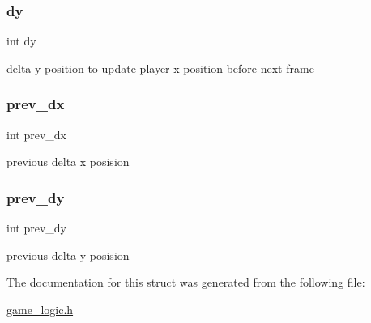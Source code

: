 \subsubsection{\texorpdfstring{dy}{dy}}
{\footnotesize\ttfamily int dy}

delta y position to update player x position before next frame \mbox{\label{structplayer__movement_a73691226e0004c9c476b99fb3a03a1e2}} 
\subsubsection{\texorpdfstring{prev\_dx}{prev\_dx}}
{\footnotesize\ttfamily int prev\+\_\+dx}

previous delta x posision \mbox{\label{structplayer__movement_a3842d3ad7383cb6c7e19fd2178a85820}} 
\subsubsection{\texorpdfstring{prev\_dy}{prev\_dy}}
{\footnotesize\ttfamily int prev\+\_\+dy}

previous delta y posision 

The documentation for this struct was generated from the following file\+:\begin{DoxyCompactItemize}
\item 
\mbox{\hyperlink{game__logic_8h}{game\+\_\+logic.\+h}}\end{DoxyCompactItemize}
